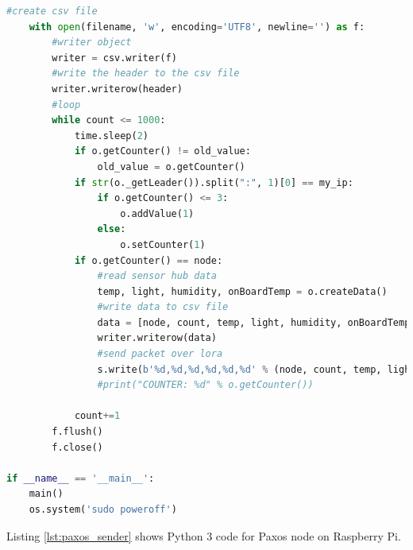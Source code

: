 \documentclass[oneside,12pt]{book}
\begin{document}
\begin{lstlisting}[language={Python}, caption={Raft Sender code - Python3},captionpos=b, label={lst:raft_sender}]
    #create csv file
    with open(filename, 'w', encoding='UTF8', newline='') as f:
        #writer object
        writer = csv.writer(f)
        #write the header to the csv file
        writer.writerow(header)
        #loop 
        while count <= 1000:
            time.sleep(2)        
            if o.getCounter() != old_value:
                old_value = o.getCounter()
            if str(o._getLeader()).split(":", 1)[0] == my_ip:
                if o.getCounter() <= 3: 
                    o.addValue(1)
                else:
                    o.setCounter(1)
            if o.getCounter() == node:
                #read sensor hub data
                temp, light, humidity, onBoardTemp = o.createData()
                #write data to csv file
                data = [node, count, temp, light, humidity, onBoardTemp]
                writer.writerow(data)
                #send packet over lora
                s.write(b'%d,%d,%d,%d,%d,%d' % (node, count, temp, light, humidity, onBoardTemp)) 
                #print("COUNTER: %d" % o.getCounter())
            
            count+=1
        f.flush()
        f.close()

if __name__ == '__main__':
    main()
    os.system('sudo poweroff')
\end{lstlisting}
Listing \ref{lst:paxos_sender} shows Python 3 code for Paxos node on Raspberry Pi.
\end{document}
